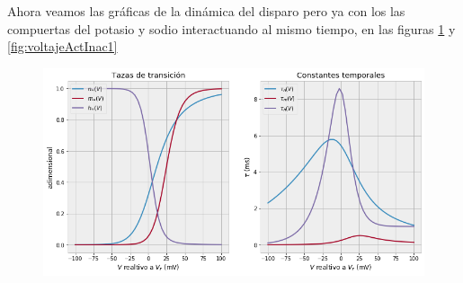 Ahora veamos las gráficas de la dinámica del disparo pero ya con los las compuertas del potasio y sodio interactuando al mismo tiempo, en las figuras \ref{fig:voltajeActInac} y \ref{fig:voltajeActInac1}


\begin{figure}[h]
 \centering
 \includegraphics[scale=0.6]{../Figuras/actinac.png}
 \label{fig:voltajeActInac}
\end{figure}



